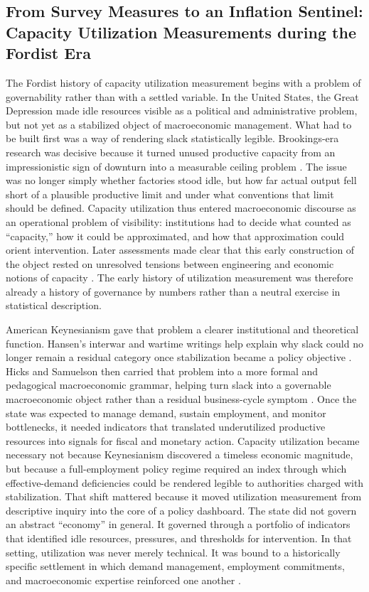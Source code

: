 \documentclass[11pt,a4paper]{article}
\begin{document}
\subsection{From Survey Measures to an Inflation Sentinel: Capacity Utilization Measurements during the Fordist Era}
\label{subsec:21_fordist_capacity_utilization}

The Fordist history of capacity utilization measurement begins with a problem of governability rather than with a settled variable. In the United States, the Great Depression made idle resources visible as a political and administrative problem, but not yet as a stabilized object of macroeconomic management. What had to be built first was a way of rendering slack statistically legible. Brookings-era research was decisive because it turned unused productive capacity from an impressionistic sign of downturn into a measurable ceiling problem \citep{Nourse1934}. The issue was no longer simply whether factories stood idle, but how far actual output fell short of a plausible productive limit and under what conventions that limit should be defined. Capacity utilization thus entered macroeconomic discourse as an operational problem of visibility: institutions had to decide what counted as ``capacity,'' how it could be approximated, and how that approximation could orient intervention. Later assessments made clear that this early construction of the object rested on unresolved tensions between engineering and economic notions of capacity \citep{Burns1954,KleinDavid1958}. The early history of utilization measurement was therefore already a history of governance by numbers rather than a neutral exercise in statistical description.

American Keynesianism gave that problem a clearer institutional and theoretical function. Hansen’s interwar and wartime writings help explain why slack could no longer remain a residual category once stabilization became a policy objective \citep{Hansen1936,Hansen1941}. Hicks and Samuelson then carried that problem into a more formal and pedagogical macroeconomic grammar, helping turn slack into a governable macroeconomic object rather than a residual business-cycle symptom \citep{Hicks1937,Samuelson1947,Samuelson1948}. Once the state was expected to manage demand, sustain employment, and monitor bottlenecks, it needed indicators that translated underutilized productive resources into signals for fiscal and monetary action. Capacity utilization became necessary not because Keynesianism discovered a timeless economic magnitude, but because a full-employment policy regime required an index through which effective-demand deficiencies could be rendered legible to authorities charged with stabilization. That shift mattered because it moved utilization measurement from descriptive inquiry into the core of a policy dashboard. The state did not govern an abstract ``economy'' in general. It governed through a portfolio of indicators that identified idle resources, pressures, and thresholds for intervention. In that setting, utilization was never merely technical. It was bound to a historically specific settlement in which demand management, employment commitments, and macroeconomic expertise reinforced one another \citep{Barber1987}.
\end{document}

